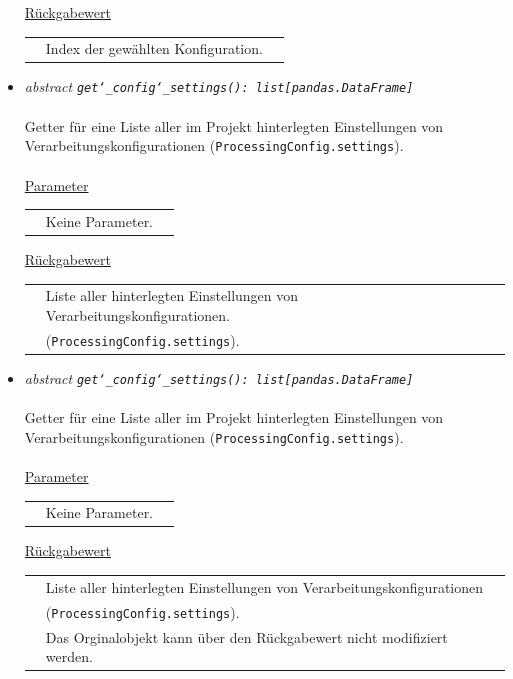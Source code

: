 \documentclass{article}
\begin{document}
\begin{itemize}
\underline{Rückgabewert}\\
\begin{tabular}{lll}
 & Index der gewählten Konfiguration.\\
\end{tabular}


\item \textit{\flqq{}abstract\frqq} \texttt{\textit{get\char`_config\char`_settings(): list[pandas.DataFrame]}}\\\\
Getter für eine Liste aller im Projekt hinterlegten Einstellungen von Verarbeitungskonfigurationen (\texttt{ProcessingConfig.settings}).
\\\\
\underline{Parameter}\\
\begin{tabular}{lll}
 & Keine Parameter.
\end{tabular}

\underline{Rückgabewert}\\
\begin{tabular}{lll}
 & Liste aller hinterlegten Einstellungen von Verarbeitungskonfigurationen.\\
 & (\texttt{ProcessingConfig.settings}).\\
\end{tabular}


\item \textit{\flqq{}abstract\frqq} \texttt{\textit{get\char`_config\char`_settings(): list[pandas.DataFrame]}}\\\\
Getter für eine Liste aller im Projekt hinterlegten Einstellungen von Verarbeitungskonfigurationen (\texttt{ProcessingConfig.settings}).
\\\\
\underline{Parameter}\\
\begin{tabular}{lll}
 & Keine Parameter.
\end{tabular}

\underline{Rückgabewert}\\
\begin{tabular}{lll}
 & Liste aller hinterlegten Einstellungen von Verarbeitungskonfigurationen\\
 & (\texttt{ProcessingConfig.settings}).\\
 & Das Orginalobjekt kann über den Rückgabewert nicht modifiziert werden.\\
\end{tabular}



\end{itemize}
\end{document}
